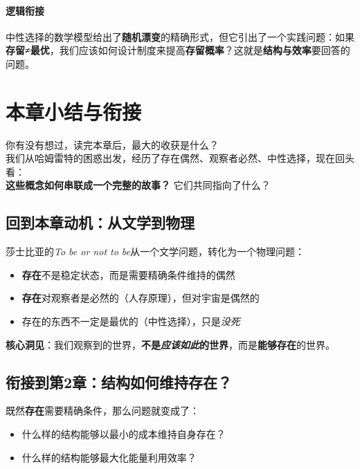 \documentclass[../main.tex]{subfiles}
\begin{document}
	\paragraph*{逻辑衔接}
	中性选择的数学模型给出了\textbf{随机漂变}的精确形式，但它引出了一个实践问题：如果\textbf{存留≠最优}，我们应该如何设计制度来提高\textbf{存留概率}？这就是\textbf{结构与效率}要回答的问题。

	\section{本章小结与衔接}

	\begin{readingnote}
		你有没有想过，读完本章后，最大的收获是什么？\\
		我们从哈姆雷特的困惑出发，经历了存在偶然、观察者必然、中性选择，现在回头看：\\
		\textbf{这些概念如何串联成一个完整的故事？} 它们共同指向了什么？
	\end{readingnote}

	\subsection{回到本章动机：从文学到物理}

	莎士比亚的\textit{To be or not to be}从一个文学问题，转化为一个物理问题：

	\begin{itemize}
		\item \textbf{存在}不是稳定状态，而是需要精确条件维持的偶然
		\item \textbf{存在}对观察者是必然的（人存原理），但对宇宙是偶然的
		\item 存在的东西不一定是最优的（中性选择），只是\textit{没死}
	\end{itemize}

	\textbf{\huge 核心洞见}：我们观察到的世界，\textbf{不是\textit{应该如此}的世界}，而是\textbf{能够存在}的世界。

	\subsection{衔接到第2章：结构如何维持存在？}

	既然\textbf{存在}需要精确条件，那么问题就变成了：

	\begin{itemize}
		\item 什么样的结构能够以最小的成本维持自身存在？
		\item 什么样的结构能够最大化能量利用效率？
	\end{itemize}
\end{document}
